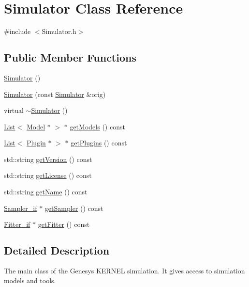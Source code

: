 \hypertarget{class_simulator}{}\section{Simulator Class Reference}
\label{class_simulator}


{\ttfamily \#include $<$Simulator.\+h$>$}

\subsection*{Public Member Functions}
\begin{DoxyCompactItemize}
\item 
\hyperlink{class_simulator_a031573bfcfe2e0f5c9539bcc1c7fc5d9}{Simulator} ()
\item 
\hyperlink{class_simulator_ad0a136ed876c971effe90fa749f18148}{Simulator} (const \hyperlink{class_simulator}{Simulator} \&orig)
\item 
virtual \hyperlink{class_simulator_a0f49aa04f42060a785adf77346b9de9f}{$\sim$\+Simulator} ()
\item 
\hyperlink{class_list}{List}$<$ \hyperlink{class_model}{Model} $\ast$ $>$ $\ast$ \hyperlink{class_simulator_adf2949b99c40c3c94c790786de1a038f}{get\+Models} () const 
\item 
\hyperlink{class_list}{List}$<$ \hyperlink{class_plugin}{Plugin} $\ast$ $>$ $\ast$ \hyperlink{class_simulator_a0e68b96d9af4bb7cf3f0b8a5c2e66d31}{get\+Plugins} () const 
\item 
std\+::string \hyperlink{class_simulator_a2e9d26646db9e0cc35a870514d8dcc3e}{get\+Version} () const 
\item 
std\+::string \hyperlink{class_simulator_ae180aeffe94a7b0af5fb64ce8ad29810}{get\+License} () const 
\item 
std\+::string \hyperlink{class_simulator_a767a6811df08f6327524ab6ccb715672}{get\+Name} () const 
\item 
\hyperlink{class_sampler__if}{Sampler\+\_\+if} $\ast$ \hyperlink{class_simulator_a7477e74d6751ea9e4b841178b0c42f34}{get\+Sampler} () const 
\item 
\hyperlink{class_fitter__if}{Fitter\+\_\+if} $\ast$ \hyperlink{class_simulator_a7498ab51b3112e487f73eefb6d384b74}{get\+Fitter} () const 
\end{DoxyCompactItemize}


\subsection{Detailed Description}
The main class of the Genesys K\+E\+R\+N\+EL simulation. It gives access to simulation models and tools. 

